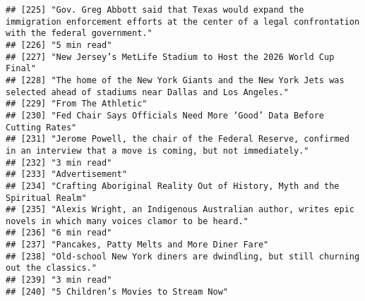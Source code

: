 \documentclass[
]{article}
\begin{document}
\begin{verbatim}
## [225] "Gov. Greg Abbott said that Texas would expand the immigration enforcement efforts at the center of a legal confrontation with the federal government."    
## [226] "5 min read"                                                                                                                                               
## [227] "New Jersey’s MetLife Stadium to Host the 2026 World Cup Final"                                                                                            
## [228] "The home of the New York Giants and the New York Jets was selected ahead of stadiums near Dallas and Los Angeles."                                        
## [229] "From The Athletic"                                                                                                                                        
## [230] "Fed Chair Says Officials Need More ‘Good’ Data Before Cutting Rates"                                                                                      
## [231] "Jerome Powell, the chair of the Federal Reserve, confirmed in an interview that a move is coming, but not immediately."                                   
## [232] "3 min read"                                                                                                                                               
## [233] "Advertisement"                                                                                                                                            
## [234] "Crafting Aboriginal Reality Out of History, Myth and the Spiritual Realm"                                                                                 
## [235] "Alexis Wright, an Indigenous Australian author, writes epic novels in which many voices clamor to be heard."                                              
## [236] "6 min read"                                                                                                                                               
## [237] "Pancakes, Patty Melts and More Diner Fare"                                                                                                                
## [238] "Old-school New York diners are dwindling, but still churning out the classics."                                                                           
## [239] "3 min read"                                                                                                                                               
## [240] "5 Children’s Movies to Stream Now"                                                                                                                        

\end{verbatim}
\end{document}
